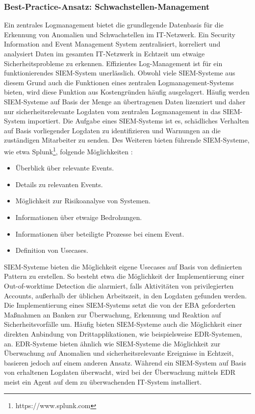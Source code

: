 \subsubsection{Best-Practice-Ansatz: Schwachstellen-Management}
Ein zentrales Logmanagement bietet die grundlegende Datenbasis für die Erkennung von Anomalien und Schwachstellen im IT-Netzwerk. Ein \glqq{}Security Information and Event Management\grqq{} System zentralisiert, korreliert und analysiert Daten im gesamten IT-Netzwerk in Echtzeit um etwaige Sicherheitsprobleme zu erkennen. Effizientes Log-Management ist für ein funktionierendes SIEM-System unerlässlich. Obwohl viele SIEM-Systeme aus diesem Grund auch die Funktionen eines zentralen Logmanagement-Systems bieten, wird diese Funktion aus Kostengründen häufig ausgelagert. Häufig werden SIEM-Systeme auf Basis der Menge an übertragenen Daten lizenziert und daher nur sicherheitsrelevante Logdaten vom zentralen Logmanagement in das SIEM-System importiert. Die Aufgabe eines SIEM-Systems ist es, schädliches Verhalten auf Basis vorliegender Logdaten zu identifizieren und Warnungen an die zuständigen Mitarbeiter zu senden. 
\bigbreak
Des Weiteren bieten führende SIEM-Systeme, wie etwa Splunk\footnote{https://www.splunk.com}, folgende Möglichkeiten \autocite{MehtaDeep2021SCSG}:
\begin{itemize}
    \item Überblick über relevante Events.
    \item Details zu relevanten Events.
    \item Möglichkeit zur Risikoanalyse von Systemen.
    \item Informationen über etwaige Bedrohungen.
    \item Informationen über beteiligte Prozesse bei einem Event.
    \item Definition von Usecases.
\end{itemize}
\bigbreak
SIEM-Systeme bieten die Möglichkeit eigene Usecases auf Basis von definierten Pattern zu erstellen. So besteht etwa die Möglichkeit der Implementierung einer \glqq{}Out-of-worktime Detection\grqq{} die alarmiert, falls Aktivitäten von privilegierten Accounts, außerhalb der üblichen Arbeitszeit, in den Logdaten gefunden werden. \autocite{MehtaDeep2021SCSG} 
\bigbreak
Die Implementierung eines SIEM-Systems setzt die von der EBA geforderten Maßnahmen an Banken zur Überwachung, Erkennung und Reaktion auf Sicherheitsvorfälle um. 
Häufig bieten SIEM-Systeme auch die Möglichkeit einer direkten Anbindung von Drittapplikationen, wie beispielsweise EDR-Systemen, an. EDR-Systeme bieten ähnlich wie SIEM-Systeme die Möglichkeit zur Überwachung auf Anomalien und sicherheitsrelevante Ereignisse in Echtzeit, basieren jedoch auf einem anderen Ansatz. Während ein SIEM-System auf Basis von erhaltenen Logdaten überwacht, wird bei der Überwachung mittels EDR meist ein Agent auf dem zu überwachenden IT-System installiert. 
